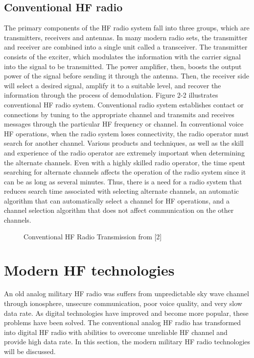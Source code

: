 \documentclass[conference]{IEEEtran}
\begin{document}
\subsection{Conventional HF radio}
The primary components of the HF radio system fall into three groups, which are transmitters, receivers and antennas. In many modern radio sets, the transmitter and receiver are combined into a single unit called a transceiver. The transmitter consists of the exciter, which modulates the information with the carrier signal into the signal to be transmitted. The power amplifier, then, boosts the output power of the signal before sending it through the antenna. Then, the receiver side will select a desired signal, amplify it to a suitable level, and recover the information through the process of demodulation. Figure 2-2 illustrates conventional HF radio system.
Conventional radio system establishes contact or connections by tuning to the appropriate channel and transmits and receives messages through the particular HF frequency or channel. In conventional voice HF operations, when the radio system loses connectivity, the radio operator must search for another channel. Various products and techniques, as well as the skill and experience of the radio operator are extremely important when determining the alternate channels. Even with a highly skilled radio operator, the time spent searching for alternate channels affects the operation of the radio system since it can be as long as several minutes. Thus, there is a need for a radio system that reduces search time associated with selecting alternate channels, an automatic algorithm that can automatically select a channel for HF operations, and a channel selection algorithm that does not affect communication on the other channels.

\begin{figure}[h!]
	\centering
	\caption{Conventional HF Radio Transmission from [2]}
\end{figure}

\section{Modern HF technologies}
An old analog military HF radio was suffers from unpredictable sky wave channel through ionosphere, unsecure communication, poor voice quality, and very slow data rate. As digital technologies have improved and become more popular, these problems have been solved. The conventional analog HF radio has transformed into digital HF radio with abilities to overcome unreliable HF channel and provide high data rate. In this section, the modern military HF radio technologies will be discussed.
\end{document}
